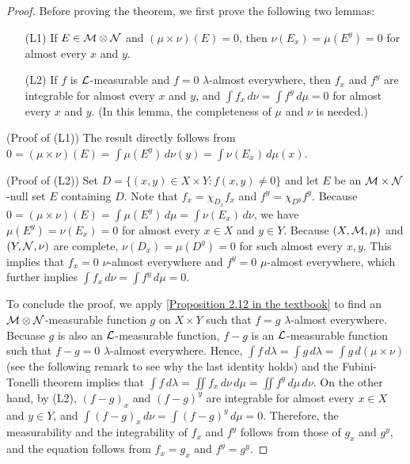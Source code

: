 \begin{proof}
    Before proving the theorem, we first prove the following two lemmas:
    \begin{enumerate}
        \item[(L1)]
        {
            If $E\in{\mathcal{M}}\otimes{\mathcal{N}}$ and $(\mu\times\nu)(E)=0$, then $\nu(E_x)=\mu(E^y)=0$ for almost every $x$ and $y$.
        }
        \item[(L2)]
        {
            If $f$ is ${\mathcal{L}}$-measurable and $f=0$ $\lambda$-almost everywhere, then $f_x$ and $f^y$ are integrable for almost every $x$ and $y$, and $\int f_x\,d\nu=\int f^y\,d\mu=0$ for almost every $x$ and $y$. (In this lemma, the completeness of $\mu$ and $\nu$ is needed.)
        }
    \end{enumerate}
    
    \noindent(Proof of (L1))\newline\indent
    The result directly follows from $0=(\mu\times\nu)(E)=\int\mu(E^y)\,d\nu(y)=\int\nu(E_x)\,d\mu(x)$.

    \noindent(Proof of (L2))\newline\indent
    Set $D=\{(x, y)\in X\times Y: f(x, y)\neq 0\}$ and let $E$ be an ${\mathcal{M}}\times{\mathcal{N}}$-null set $E$ containing $D$.
    Note that $f_x=\chi_{D_x}f_x$ and $f^y=\chi_{D^y}f^y$.
    Because $0=(\mu\times\nu)(E)=\int\mu(E^y)\,d\mu=\int\nu(E_x)\,d\nu$, we have $\mu(E^y)=\nu(E_x)=0$ for almost every $x\in X$ and $y\in Y$.
    Because $(X, {\mathcal{M}}, \mu)$ and $(Y, {\mathcal{N}}, \nu)$ are complete, $\nu(D_x)=\mu(D^y)=0$ for such almost every $x, y$.
    This implies that $f_x=0$ $\nu$-almost everywhere and $f^y=0$ $\mu$-almost everywhere, which further implies $\int f_x\,d\nu=\int f^y\,d\mu=0$.

    To conclude the proof, we apply \cref{Proposition 2.12 in the textbook} to find an ${\mathcal{M}}\otimes{\mathcal{N}}$-measurable function $g$ on $X\times Y$ such that $f=g$ $\lambda$-almost everywhere.
    Becuase $g$ is also an ${\mathcal{L}}$-measurable function, $f-g$ is an ${\mathcal{L}}$-measurable function such that $f-g=0$ $\lambda$-almost everywhere.
    Hence, $\int f\,d\lambda=\int g\,d\lambda=\int g\,d(\mu\times\nu)$ (see the following remark to see why the last identity holds) and the Fubini-Tonelli theorem implies that
    $\int f\,d\lambda=\iint f_x\,d\nu\,d\mu=\iint f^y\,d\mu\,d\nu$.
    On the other hand, by (L2), $(f-g)_x$ and $(f-g)^y$ are integrable for almost every $x\in X$ and $y\in Y$, and $\int(f-g)_x\,d\nu=\int(f-g)^y\,d\mu=0$.
    Therefore, the measurability and the integrability of $f_x$ and $f^y$ follows from those of $g_x$ and $g^y$, and the equation follows from $f_x=g_x$ and $f^y=g^y$.
\end{proof}
\fi

